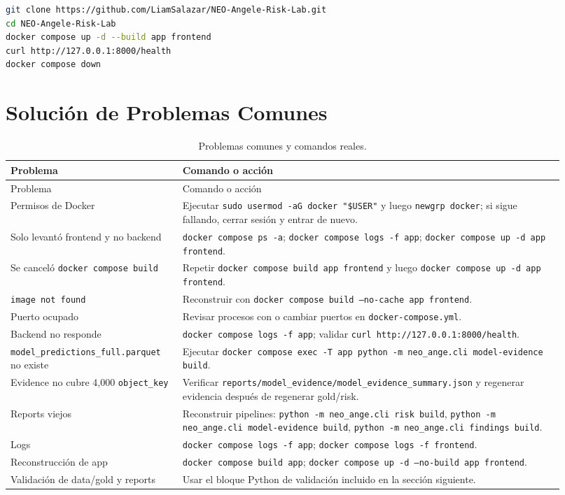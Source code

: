 \documentclass[12pt,a4paper]{report}
\newcommand{\code}[1]{\texttt{#1}}
\DeclareRobustCommand{\codepath}[1]{\texttt{\detokenize{#1}}}
\begin{document}
\begin{lstlisting}[language=bash]
git clone https://github.com/LiamSalazar/NEO-Angele-Risk-Lab.git
cd NEO-Angele-Risk-Lab
docker compose up -d --build app frontend
curl http://127.0.0.1:8000/health
docker compose down
\end{lstlisting}

\chapter{Solución de Problemas Comunes}

{\footnotesize
\setlength{\tabcolsep}{4pt}
\begin{longtable}{>{\RaggedRight\arraybackslash}p{0.28\linewidth}>{\RaggedRight\arraybackslash}p{0.64\linewidth}}
\caption{Problemas comunes y comandos reales.}\\
\toprule
Problema & Comando o acción\\
\midrule
\endfirsthead
\toprule
Problema & Comando o acción\\
\midrule
\endhead
Permisos de Docker & Ejecutar \code{sudo usermod -aG docker "\$USER"} y luego \code{newgrp docker}; si sigue fallando, cerrar sesión y entrar de nuevo.\\
Solo levantó frontend y no backend & \code{docker compose ps -a}; \code{docker compose logs -f app}; \code{docker compose up -d app frontend}.\\
Se canceló \code{docker compose build} & Repetir \code{docker compose build app frontend} y luego \code{docker compose up -d app frontend}.\\
\code{image not found} & Reconstruir con \code{docker compose build --no-cache app frontend}.\\
Puerto ocupado & Revisar procesos con \codepath{sudo ss -ltnp | grep ':8000|:5174'} o cambiar puertos en \code{docker-compose.yml}.\\
Backend no responde & \code{docker compose logs -f app}; validar \code{curl http://127.0.0.1:8000/health}.\\
\code{model\_predictions\_full.parquet} no existe & Ejecutar \code{docker compose exec -T app python -m neo\_ange.cli model-evidence build}.\\
Evidence no cubre 4,000 \code{object\_key} & Verificar \code{reports/model\_evidence/model\_evidence\_summary.json} y regenerar evidencia después de regenerar gold/risk.\\
Reports viejos & Reconstruir pipelines: \code{python -m neo\_ange.cli risk build}, \code{python -m neo\_ange.cli model-evidence build}, \code{python -m neo\_ange.cli findings build}.\\
Logs & \code{docker compose logs -f app}; \code{docker compose logs -f frontend}.\\
Reconstrucción de app & \code{docker compose build app}; \code{docker compose up -d --no-build app frontend}.\\
Validación de data/gold y reports & Usar el bloque Python de validación incluido en la sección siguiente.\\
\bottomrule
\end{longtable}
}
\end{document}
